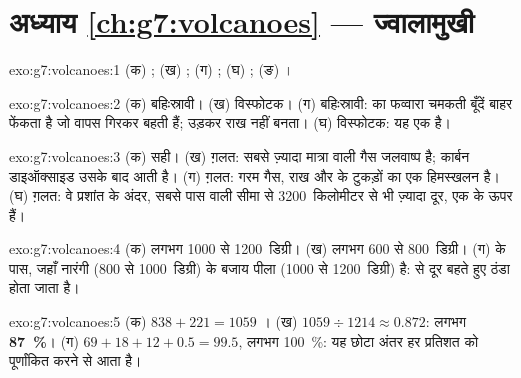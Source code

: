 \section*{अध्याय \ref{ch:g7:volcanoes} --- ज्वालामुखी}

\begin{solution}{exo:g7:volcanoes:1}
(क) ; (ख) ; (ग) ; (घ) ; (ङ) ।
\end{solution}

\begin{solution}{exo:g7:volcanoes:2}
(क) बहिःस्रावी। (ख) विस्फोटक। (ग) बहिःस्रावी:  का फव्वारा चमकती बूँदें
बाहर फेंकता है जो वापस गिरकर बहती हैं;  उड़कर राख नहीं बनता।
(घ) विस्फोटक: यह एक  है।
\end{solution}

\begin{solution}{exo:g7:volcanoes:3}
(क) सही। (ख) ग़लत: सबसे ज़्यादा मात्रा वाली  गैस जलवाष्प है; कार्बन
डाइऑक्साइड उसके बाद आती है। (ग) ग़लत:  गरम गैस, राख और
 के टुकड़ों का एक हिमस्खलन है। (घ) ग़लत: वे प्रशांत  के अंदर, सबसे
पास वाली सीमा से 3200~किलोमीटर से भी ज़्यादा दूर, एक  के ऊपर
हैं।
\end{solution}

\begin{solution}{exo:g7:volcanoes:4}
(क) लगभग 1000 से 1200~डिग्री। (ख) लगभग 600 से 800~डिग्री। (ग)  के
पास, जहाँ  नारंगी (800 से 1000~डिग्री) के बजाय पीला (1000 से 1200~डिग्री)
है:  से दूर बहते हुए  ठंडा होता जाता है।
\end{solution}

\begin{solution}{exo:g7:volcanoes:5}
(क) $838 + 221 = 1059$ । (ख) $1059 \div 1214 \approx 0.872$:
लगभग \textbf{87~\%}। (ग) $69 + 18 + 12 + 0.5 = 99.5$, लगभग 100~\%: यह छोटा
अंतर हर प्रतिशत को पूर्णांकित करने से आता है।
\end{solution}

